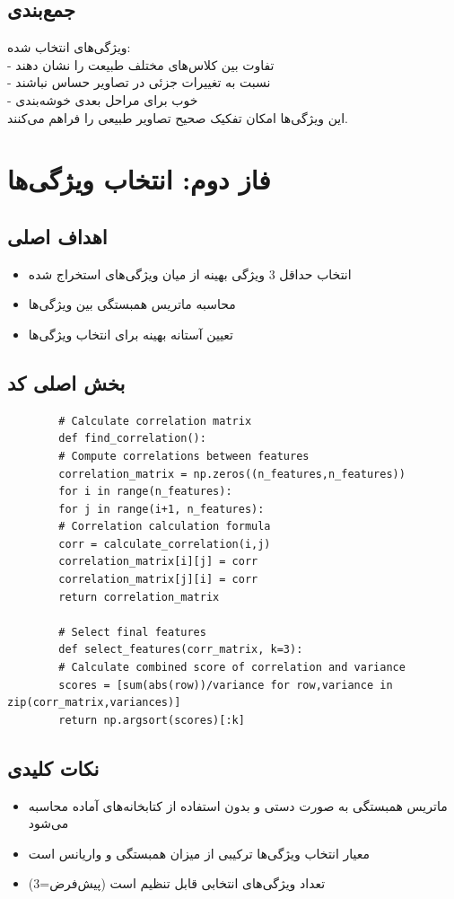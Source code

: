 \documentclass[a4paper,12pt]{article}
\let\nobreaksection\section
\renewcommand{\section}{\nobreaksection}  %
\begin{document}
\subsection*{\textbf{جمع‌بندی}}
ویژگی‌های انتخاب شده:
\\
- تفاوت بین کلاس‌های مختلف طبیعت را نشان دهند
\\
- نسبت به تغییرات جزئی در تصاویر حساس نباشند
\\
- خوب برای مراحل بعدی خوشه‌بندی 
\\
این ویژگی‌ها امکان تفکیک صحیح تصاویر طبیعی را فراهم می‌کنند.
	
	
	\section{فاز دوم: انتخاب ویژگی‌ها}
	
	\subsection{اهداف اصلی}
	\begin{itemize}
		\item انتخاب حداقل 3 ویژگی بهینه از میان ویژگی‌های استخراج شده
		\item محاسبه ماتریس همبستگی بین ویژگی‌ها
		\item تعیین آستانه بهینه برای انتخاب ویژگی‌ها
	\end{itemize}
	
	\subsection{بخش اصلی کد}
\begin{latin}
	\begin{verbatim}
		# Calculate correlation matrix
		def find_correlation():
		# Compute correlations between features
		correlation_matrix = np.zeros((n_features,n_features))
		for i in range(n_features):
		for j in range(i+1, n_features):
		# Correlation calculation formula
		corr = calculate_correlation(i,j)
		correlation_matrix[i][j] = corr
		correlation_matrix[j][i] = corr
		return correlation_matrix
		
		# Select final features
		def select_features(corr_matrix, k=3):
		# Calculate combined score of correlation and variance
		scores = [sum(abs(row))/variance for row,variance in zip(corr_matrix,variances)]
		return np.argsort(scores)[:k]
	\end{verbatim}
\end{latin}
	
	\subsection{نکات کلیدی}
	\begin{itemize}
		\item ماتریس همبستگی به صورت دستی و بدون استفاده از کتابخانه‌های آماده محاسبه می‌شود
		\item معیار انتخاب ویژگی‌ها ترکیبی از میزان همبستگی و واریانس است
		\item تعداد ویژگی‌های انتخابی قابل تنظیم است (پیش‌فرض=3)
	\end{itemize}
	
\end{document}
